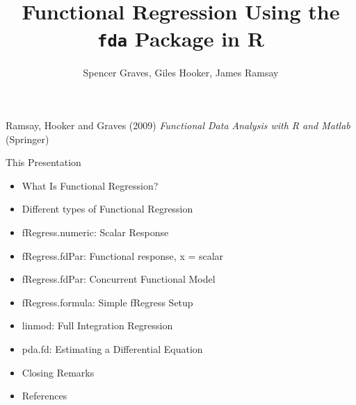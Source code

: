 \documentclass[compress]{beamer}
\begin{document}

\title{
Functional Regression \newline
Using the \texttt{fda} Package in R}
\author{Spencer Graves, Giles Hooker, James Ramsay}

\date{}

\begin{frame}

\maketitle

Ramsay, Hooker and Graves (2009)
\emph{Functional Data Analysis with R and Matlab}
(Springer)

\end{frame}

\begin{frame}{This Presentation}

\begin{itemize}
\item What Is Functional Regression?

\item Different types of Functional Regression

\item fRegress.numeric:  Scalar Response

\item fRegress.fdPar:  Functional response, x = scalar 

\item fRegress.fdPar:  Concurrent Functional Model

\item fRegress.formula:  Simple fRegress Setup

\item linmod:  Full Integration Regression

\item pda.fd:  Estimating a Differential Equation

\item Closing Remarks

\item References

\end{itemize}

\end{frame}
\end{document}
